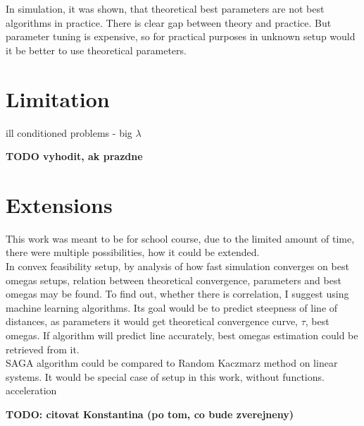 \documentclass[11pt]{book}
\begin{document}
In simulation, it was shown, that theoretical best parameters are not best algorithms in practice. There is clear gap between theory and practice. But parameter tuning is expensive, so for practical purposes in unknown setup would it be better to use theoretical parameters.


\section{Limitation}
ill conditioned problems - big $\lambda$

\textbf{TODO vyhodit, ak prazdne}

\section{Extensions}
This work was meant to be for school course, due to the limited amount of time, there were multiple possibilities, how it could be extended.\\


In convex feasibility setup, by analysis of how fast simulation converges on best omegas setups, relation between theoretical convergence, parameters and best omegas may be found. To find out, whether there is correlation, I suggest using machine learning algorithms. Its goal would be to predict steepness of line of distances, as parameters it would get theoretical convergence curve, $\tau$, best omegas. If algorithm will predict line accurately, best omegas estimation could be retrieved from it.\\


SAGA algorithm could be compared to Random Kaczmarz method on linear systems. It would be special case of setup in this work, without functions.\\

acceleration






\textbf{TODO: citovat Konstantina (po tom, co bude zverejneny)}
\end{document}
